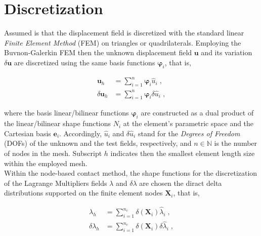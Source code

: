 \documentclass[10pt,a4paper]{article}
\begin{document}
\section{Discretization}

Assumed is that the displacement field is discretized with the standard linear \textit{Finite Element Method} (FEM) on triangles or quadrilaterals. Employing the Buvnon-Galerkin FEM then the unknown displacement field $\mathbf{u}$ and its variation $\delta \mathbf{u}$ are discretized using the same basis functions $\boldsymbol{\varphi}_i$, that is,

\begin{subequations}
	\begin{alignat}{1}
		\mathbf{u}_h &= \sum_{i = 1}^{n} \boldsymbol{\varphi}_i \hat{u}_i \;, \label{eq:discretization_u} \\
		\delta \mathbf{u}_h &= \sum_{i = 1}^n \boldsymbol{\varphi}_i \delta\hat{u}_i \;, \label{eq:discretization_delta_u}
	\end{alignat}
\end{subequations}

where the basis linear/bilinear functions $\boldsymbol{\varphi}_i$ are constructed as a dual product of the linear/bilinear shape functions $N_i$ at the element's parametric space and the Cartesian basis $\mathbf{e}_i$. Accordingly, $\hat{u}_i$ and $\delta\hat{u}_i$ stand for the \textit{Degrees of Freedom} (DOFs) of the unknown and the test fields, respectively, and $n \in \mathbb{N}$ is the number of nodes in the mesh. Subscript $h$ indicates then the smallest element length size within the employed mesh.\\

Within the node-based contact method, the shape functions for the discretization of the Lagrange Multipliers fields $\lambda$ and $\delta \lambda$ are chosen the diract delta distributions supported on the finite element nodes $\mathbf{X}_i$, that is,

\begin{subequations}
	\begin{alignat}{1}
		\lambda_h &= \sum_{i = 1}^{n_{\text{c}}} \delta(\mathbf{X}_i) \hat{\lambda}_i \;, \label{eq:discretization_lambda} \\
		\delta \lambda_h &= \sum_{i = 1}^{n_{\text{c}}} \delta(\mathbf{X}_i) \delta\hat{\lambda}_i \;, \label{eq:discretization_lambda_u}
	\end{alignat}
\end{subequations}
\end{document}
